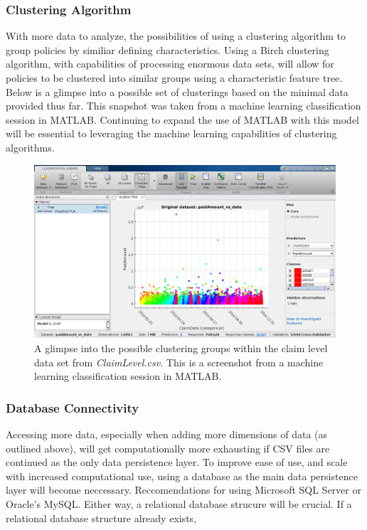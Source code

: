 \documentclass[12pt,letterpaper,titlepage]{article}
\begin{document}
			
		\subsubsection*{Clustering Algorithm}		
		With more data to analyze, the possibilities of using a clustering algorithm to group policies by similiar defining characteristics. Using a Birch clustering algorithm, with capabilities of processing enormous data sets, will allow for policies to be clustered into similar groups using a characteristic feature tree. Below is a glimpse into a possible set of clusterings based on the minimal data provided thus far. This snapshot was taken from a machine learning classification session in MATLAB\texttrademark. Continuing to expand the use of MATLAB\texttrademark\; with this model will be essential to leveraging the machine learning capabilities of clustering algorithms.  
		
			\begin{figure}[!ht]
				\centering
				\includegraphics[scale=0.36]{Screenshot-MATLAB-clusterings.png}
				\caption{A glimpse into the possible clustering groups within the claim level data set from \emph{ClaimLevel.csv}. This is a screenshot from a machine learning classification session in MATLAB\texttrademark.}
				\label{fig:clusteringPotential}
			\end{figure}
			\FloatBarrier
		
		\subsubsection*{Database Connectivity} 
		Accessing more data, especially when adding more dimensions of data (as outlined above), will get computationally more exhausting if CSV files are continued as the only data persistence layer. To improve ease of use, and scale with increased computational use, using a database as the main data persistence layer will become neccessary. Reccomendations for using Microsoft SQL Server or Oracle's MySQL. Either way, a relational database strucure will be crucial. If a relational database structure already exists, 
		
\end{document}
